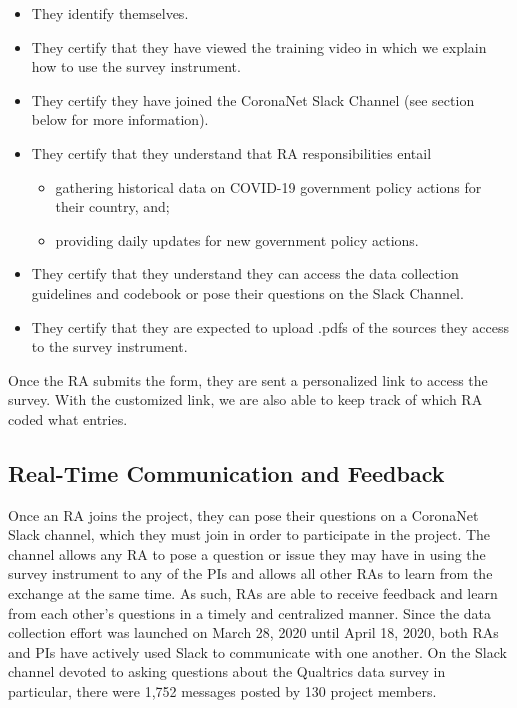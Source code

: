 \documentclass[]{article}
\providecommand{\tightlist}{%
  \setlength{\itemsep}{0pt}\setlength{\parskip}{0pt}}
\begin{document}
\begin{itemize}
\tightlist
\item
  They identify themselves.
\item
  They certify that they have viewed the training video in which we explain how to use the survey instrument.
\item
  They certify they have joined the CoronaNet Slack Channel (see section below for more information).
\item
  They certify that they understand that RA responsibilities entail

  \begin{itemize}
  \tightlist
  \item
    gathering historical data on COVID-19 government policy actions for their country, and;
  \item
    providing daily updates for new government policy actions.
  \end{itemize}
\item
  They certify that they understand they can access the data collection guidelines and codebook or pose their questions on the Slack Channel.
\item
  They certify that they are expected to upload .pdfs of the sources they access to the survey instrument.
\end{itemize}

Once the RA submits the form, they are sent a personalized link to access the survey. With the customized link, we are also able to keep track of which RA coded what entries.

\hypertarget{real-time-communication-and-feedback}{%
\subsection{Real-Time Communication and Feedback}\label{real-time-communication-and-feedback}}

Once an RA joins the project, they can pose their questions on a CoronaNet Slack channel, which they must join in order to participate in the project. The channel allows any RA to pose a question or issue they may have in using the survey instrument to any of the PIs and allows all other RAs to learn from the exchange at the same time. As such, RAs are able to receive feedback and learn from each other's questions in a timely and centralized manner. Since the data collection effort was launched on March 28, 2020 until April 18, 2020, both RAs and PIs have actively used Slack to communicate with one another. On the Slack channel devoted to asking questions about the Qualtrics data survey in particular, there were 1,752 messages posted by 130 project members.
\end{document}
